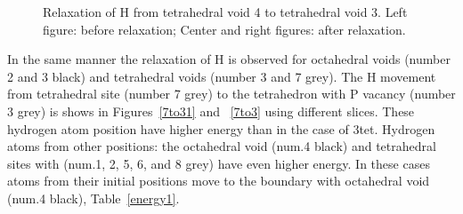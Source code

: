 \begin{figure}[h]
\begin{minipage}[h]{0.3\linewidth}
\end{minipage}
\hfill
\begin{minipage}[h]{0.3\linewidth}
\end{minipage}
\caption{Relaxation of H from tetrahedral void 4 to tetrahedral void 3. Left figure: before relaxation; Center and right figures: after relaxation.}
\label{4to3}
\end{figure}

In the same manner the relaxation of H is observed for octahedral voids (number 2 and 3 black) and tetrahedral voids (number 3 and 7 grey). The H movement from tetrahedral site (number 7 grey) to the tetrahedron with P vacancy (number 3 grey) is shows in Figures~\ref{7to31} and ~\ref{7to3} using different slices.  These hydrogen atom position have higher energy than in the case of 3tet. Hydrogen atoms from other positions: the octahedral void (num.4 black) and tetrahedral sites with (num.1, 2, 5, 6, and 8 grey) have even higher energy. In these cases atoms from their initial positions move to the boundary with octahedral void (num.4 black), Table~\ref{energy1}.

